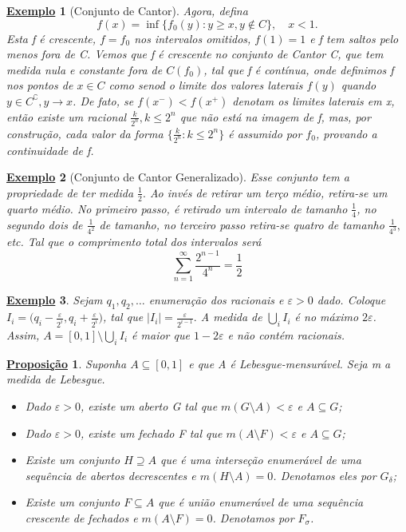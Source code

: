\documentclass{article}
\newtheorem*{prop*}{\underline{Proposi\c c\~ao}}
\newtheorem{example}{\underline{Exemplo}}
\begin{document}
\begin{example}[Conjunto de Cantor]
 Agora, defina 
   \[
     f(x) = \inf_{}\{f_{0}(y): y \geq x, y\not\in C\},\quad x < 1.
   \]
   Esta f é crescente, \(f = f_{0}\) nos intervalos omitidos, \(f(1) = 1\) e f tem saltos pelo menos fora de C. Vemos que f é crescente no conjunto de Cantor C, que tem medida nula e 
   constante fora de \(C(f_{0})\), tal que f é contínua, onde definimos f nos pontos de \(x\in C\) como senod o limite dos valores laterais \(f(y)\) quando \(y\in C ^{\complement},y\to x\). De fato, 
   se \(f(x^{-}) < f(x^{+})\) denotam os limites laterais em x, então existe um racional \(\frac{k}{2^{n}}, k \leq 2^{n}\) que não está na imagem de f, mas, por construção, cada valor da forma \(\biggl\{\frac{k}{2^{n}}: k \leq 2^{n}\biggr\}\) é 
   assumido por \(f_{0}\), provando a continuidade de f.
\end{example}
\begin{example}[Conjunto de Cantor Generalizado]
  Esse conjunto tem a propriedade de ter medida \(\frac{1}{2}.\) Ao invés de retirar um terço médio, retira-se um quarto médio. No primeiro passo, é retirado um intervalo de tamanho \(\frac{1}{4}\), no segundo dois de \(\frac{1}{4^{2}}\) de tamanho, no 
terceiro passo retira-se quatro de tamanho \(\frac{1}{4^{3}},\) etc. Tal que o comprimento total dos intervalos será 
  \[
    \sum\limits_{n=1}^{\infty}\frac{2^{n-1}}{4^{n}} = \frac{1}{2}
  \]
\end{example}
\begin{example}
  Sejam \(q_1, q_2, \dotsc \) enumeração dos racionais e \(\varepsilon > 0\) dado. Coloque \(I_{i} = \biggl(q_{i} - \frac{\varepsilon }{2^{i}}, q_{i} + \frac{\varepsilon }{2^{i}}\biggr)\), tal que \(|I_{i}| = \frac{\varepsilon }{2^{i-1}}.\) 
  A medida de \(\bigcup_{i}^{}I_{i}\) é no máximo \(2\varepsilon\). Assim, \(A = [0, 1]\setminus{\bigcup_{i}^{}I_{i}}\) é maior que \(1 - 2\varepsilon \) e não contém racionais.
\end{example}
\begin{prop*}
  Suponha \(A\subseteq [0, 1]\) e que A é Lebesgue-mensurável. Seja m a medida de Lebesgue. 
 \begin{itemize}
   \item[1)] Dado \(\varepsilon > 0\), existe um aberto G tal que \(m(G\setminus{A}) < \varepsilon \) e \(A\subseteq G\);
     \item[2)] Dado \(\varepsilon > 0\), existe um fechado F tal que \(m(A\setminus{F}) < \varepsilon \) e \(A\subseteq G\);
       \item[3)] Existe um conjunto \(H \supseteq A\) que é uma interseção enumerável de uma sequência de abertos decrescentes e \(m(H\setminus{A}) = 0\). Denotamos eles por \(G_\delta \);
         \item[4)] Existe um conjunto \(F\subseteq A\) que é união enumerável de uma sequência crescente de fechados e \(m(A\setminus{F}) = 0\). Denotamos por \(F_{\sigma }\).
 \end{itemize}
\end{prop*}
\end{document}
